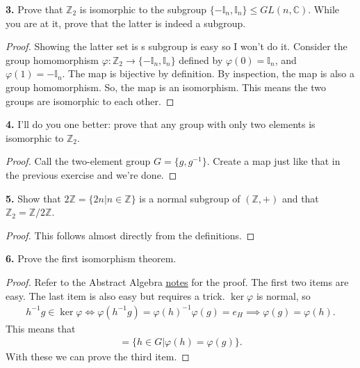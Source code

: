 \documentclass{book}
\theoremstyle{definition}
\begin{document}
\noindent \textbf{3.} Prove that $\mathbb{Z}_2$ is isomorphic to the subgroup $\{-\mathbb{I}_n, \mathbb{I}_n \} \leq GL(n,\mathbb{C})$. While you are at it, prove that the latter is indeed a subgroup.

\begin{proof}
	Showing the latter set is s subgroup is easy so I won't do it. Consider the group homomorphism $\varphi: \mathbb{Z}_2 \to \{ -\mathbb{I}_n, \mathbb{I}_n \}$ defined by $\varphi(0) = \mathbb{I}_n$, and $\varphi(1) = -\mathbb{I}_n$. The map is bijective by definition. By inspection, the map is also a group homomorphism. So, the map is an isomorphism. This means the two groups are isomorphic to each other. 
\end{proof}


\noindent \textbf{4.} I'll do you one better: prove that any group with only two elements is isomorphic to $\mathbb{Z}_2$.

\begin{proof}
	Call the two-element group $G = \{ g,g^{-1} \}$. Create a map just like that in the previous exercise and we're done. 
\end{proof}





\noindent \textbf{5.} Show that $2\mathbb{Z} = \{ 2n \vert n \in \mathbb{Z} \}$ is a normal subgroup of $(\mathbb{Z},+)$ and that $\mathbb{Z}_2 = \mathbb{Z} / 2\mathbb{Z}$.


\begin{proof}
	This follows almost directly from the definitions. 
\end{proof}





\noindent \textbf{6.} Prove the first isomorphism theorem.

\begin{proof}
	Refer to the Abstract Algebra \href{https://huanqbui.com/archives/MA333.pdf}{\underline{notes}} for the proof. The first two items are easy. The last item is also easy but requires a trick. $\ker\varphi$ is normal, so 
	\begin{align}
	h^{-1}g \in \ker\varphi \iff \varphi(h^{-1}g) = \varphi(h)^{-1}\varphi(g)  = e_H \implies \varphi(g) = \varphi(h).
	\end{align}
	This means that 
	\begin{align}
	[g] = \{ h\in G \vert \varphi(h) = \varphi(g)   \}. 
	\end{align}
	With these we can prove the third item. 
\end{proof}
\end{document}
